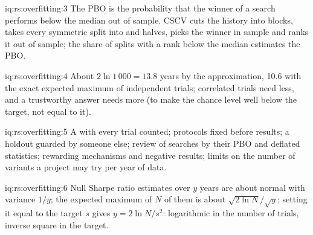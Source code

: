 \begin{solution}{iq:rs:overfitting:3}
The PBO is the probability that the  winner of a search performs below the median out of sample. CSCV cuts the history into blocks, takes every
symmetric split into  and  halves, picks the winner in sample and ranks it out of sample; the share of splits with a rank below the median
estimates the PBO.
\end{solution}

\begin{solution}{iq:rs:overfitting:4}
About $2\ln 1\,000 = 13.8$ years by the approximation, 10.6 with the exact expected maximum of independent trials; correlated trials need less, and a trustworthy
answer needs more (to make the chance level well below the target, not equal to it).
\end{solution}

\begin{solution}{iq:rs:overfitting:5}
A  with every trial counted; protocols fixed before results; a holdout guarded by someone else; review of searches by their PBO and deflated statistics;
rewarding mechanisms and negative results; limits on the number of variants a project may try per year of data.
\end{solution}

\begin{solution}{iq:rs:overfitting:6}
Null Sharpe ratio estimates over $y$ years are about normal with variance $1/y$; the expected maximum of $N$ of them is about $\sqrt{2\ln N}/\sqrt y$; setting it equal to the
target $s$ gives $y = 2\ln N/s^2$: logarithmic in the number of trials, inverse square in the target.
\end{solution}

